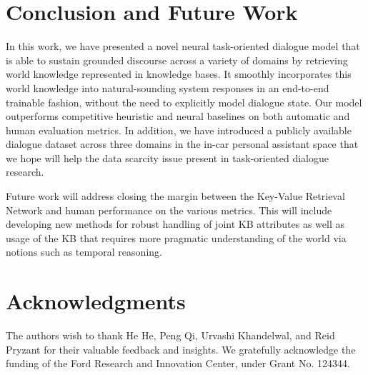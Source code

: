 \documentclass[11pt,a4paper]{article}
\begin{document}
\section{Conclusion and Future Work}
  In this work, we have presented a novel neural task-oriented dialogue model that is able to sustain grounded discourse across a variety of domains by retrieving world knowledge represented in knowledge bases. It smoothly incorporates this world knowledge into natural-sounding system responses in an end-to-end trainable fashion, without the need to explicitly model dialogue state. Our model outperforms competitive heuristic and neural baselines on both automatic and human evaluation metrics. In addition, we have introduced a publicly available dialogue dataset across three domains in the in-car personal assistant space that we hope will help the data scarcity issue present in task-oriented dialogue research. 

  Future work will address closing the margin between the Key-Value Retrieval Network and human performance on the various metrics. This will include developing new methods for robust handling of joint KB attributes as well as usage of the KB that requires more pragmatic understanding of the world via notions such as temporal reasoning. 


\section*{Acknowledgments}

The authors wish to thank He He, Peng Qi, Urvashi Khandelwal, and Reid Pryzant for their valuable feedback and insights. We gratefully acknowledge the funding of the Ford Research and Innovation Center, under Grant No. 124344. 






\appendix
\end{document}
